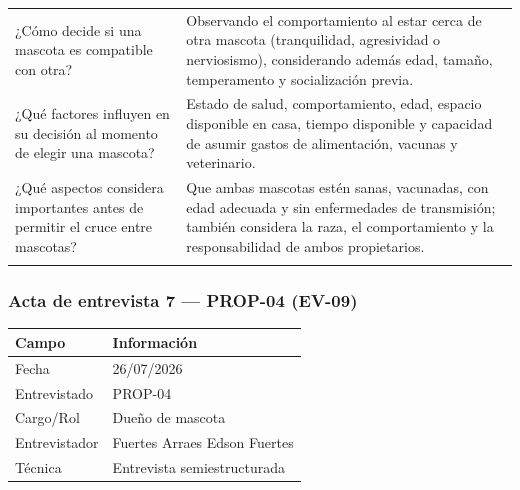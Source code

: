 \documentclass[journal,onecolumn]{IEEEtran}
\begin{document}
{\begin{longtable}{@{}p{5.6cm} p{9.4cm}@{}}
		¿Cómo decide si una mascota es compatible con otra? & Observando el comportamiento al estar cerca de otra mascota (tranquilidad, agresividad o nerviosismo), considerando además edad, tamaño, temperamento y socialización previa. \\ \addlinespace
		
		¿Qué factores influyen en su decisión al momento de elegir una mascota? & Estado de salud, comportamiento, edad, espacio disponible en casa, tiempo disponible y capacidad de asumir gastos de alimentación, vacunas y veterinario. \\ \addlinespace
		
		¿Qué aspectos considera importantes antes de permitir el cruce entre mascotas? & Que ambas mascotas estén sanas, vacunadas, con edad adecuada y sin enfermedades de transmisión; también considera la raza, el comportamiento y la responsabilidad de ambos propietarios. \\ \addlinespace
		
	\end{longtable}
}


\subsubsection*{Acta de entrevista 7 --- PROP-04 (EV-09)}
	
	\begin{table}[H]
		\centering\small
		\begin{tabularx}{\textwidth}{@{}l X@{}}
			\toprule
			\textbf{Campo} & \textbf{Información} \\
			\midrule
			
			Fecha & 26/07/2026 \\
			
			Entrevistado & PROP-04 \\
			
			Cargo/Rol & Dueño de mascota \\
			
			Entrevistador & Fuertes Arraes Edson Fuertes \\
			
			Técnica & Entrevista semiestructurada \\
			
			\bottomrule
		\end{tabularx}
	\end{table}
	
\end{document}
